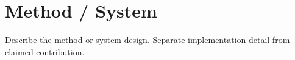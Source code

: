 \section{Method / System}

Describe the method or system design. Separate implementation detail from claimed contribution.
